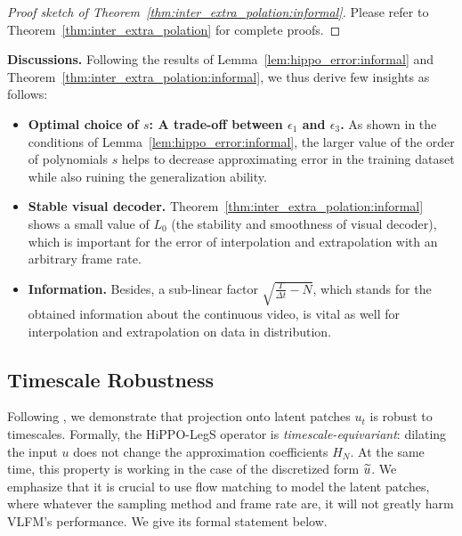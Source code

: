 \begin{proof}[Proof sketch of Theorem~\ref{thm:inter_extra_polation:informal}]
    Please refer to Theorem~\ref{thm:inter_extra_polation} for complete proofs.
\end{proof}

{\bf Discussions.} Following the results of Lemma~\ref{lem:hippo_error:informal} and Theorem~\ref{thm:inter_extra_polation:informal}, we thus derive few insights as follows:
\begin{itemize}
    \item {\bf Optimal choice of $s$: A trade-off between $\epsilon_1$ and $\epsilon_3$. } As shown in the conditions of Lemma~\ref{lem:hippo_error:informal}, the larger value of the order of polynomials $s$ helps to decrease approximating error in the training dataset while also ruining the generalization ability.
    \ifdefined\isarxiv
    \else
    \vspace{-2mm}
    \fi
    \item {\bf Stable visual decoder. } Theorem~\ref{thm:inter_extra_polation:informal} shows a small value of $L_0$ (the stability and smoothness of visual decoder), which is important for the error of interpolation and extrapolation with an arbitrary frame rate.
    \ifdefined\isarxiv
    \else
    \vspace{-3mm}
    \fi
    \item {\bf Information. } Besides, a sub-linear factor $\sqrt{\frac{T}{\Delta t} - N}$, which stands for the obtained information about the continuous video, is vital as well for interpolation and extrapolation on data in distribution.
\end{itemize}
\ifdefined\isarxiv
\else
\vspace{-6mm}
\fi

\subsection{Timescale Robustness}\label{sub:timescale_robustness}

Following \cite{gde+20}, we demonstrate that projection onto latent patches $u_t$ is robust to timescales. Formally, the HiPPO-LegS operator is {\it timescale-equivariant}: dilating the input $u$ does not change the approximation coefficients $H_N$. At the same time, this property is working in the case of the discretized form $\widetilde{u}$. We emphasize that it is crucial to use flow matching to model the latent patches, where whatever the sampling method and frame rate are, it will not greatly harm VLFM's performance. We give its formal statement below.

